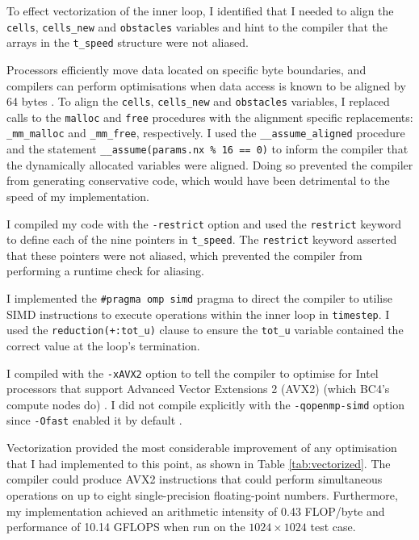 \documentclass[twocolumn, a4paper]{article}
\begin{document}
To effect vectorization of the inner loop, I identified that I needed to align the \texttt{cells}, \texttt{cells\_new} and \texttt{obstacles} variables and hint to the compiler that the arrays in the \texttt{t\_speed} structure were not aliased.

Processors efficiently move data located on specific byte boundaries, and compilers can perform optimisations when data access is known to be aligned by 64 bytes \cite{alignment}.
To align the \texttt{cells}, \texttt{cells\_new} and \texttt{obstacles} variables, I replaced calls to the \texttt{malloc} and \texttt{free} procedures with the alignment specific replacements: \texttt{\_mm\_malloc} and \texttt{\_mm\_free}, respectively.
I used the \texttt{\_\_assume\_aligned} procedure and  the statement \texttt{\_\_assume(params.nx \% 16 == 0)} to inform the compiler that the dynamically allocated variables were aligned.
Doing so prevented the compiler from generating conservative code, which would have been detrimental to the speed of my implementation.

I compiled my code with the \texttt{-restrict} option and used the \texttt{restrict} keyword to define each of the nine pointers in \texttt{t\_speed}.
The \texttt{restrict} keyword asserted that these pointers were not aliased, which prevented the compiler from performing a runtime check for aliasing.

I implemented the \texttt{\#pragma omp simd} pragma to direct the compiler to utilise SIMD instructions to execute operations within the inner loop in \texttt{timestep}.
I used the \texttt{reduction(+:tot\_u)} clause to ensure the \texttt{tot\_u} variable contained the correct value at the loop's termination.

I compiled with the \texttt{-xAVX2} option to tell the compiler to optimise for Intel processors that support Advanced Vector Extensions 2 (AVX2) (which BC4's compute nodes do) \cite{lenovo}.
I did not compile explicitly with the \texttt{-qopenmp-simd} option since \texttt{-Ofast} enabled it by default \cite{icc}.

Vectorization provided the most considerable improvement of any optimisation that I had implemented to this point, as shown in Table \ref{tab:vectorized}.
The compiler could produce AVX2 instructions that could perform simultaneous operations on up to eight single-precision floating-point numbers.
Furthermore, my implementation achieved an arithmetic intensity of 0.43 FLOP/byte and performance of 10.14 GFLOPS when run on the $1024\times1024$ test case.
\end{document}
